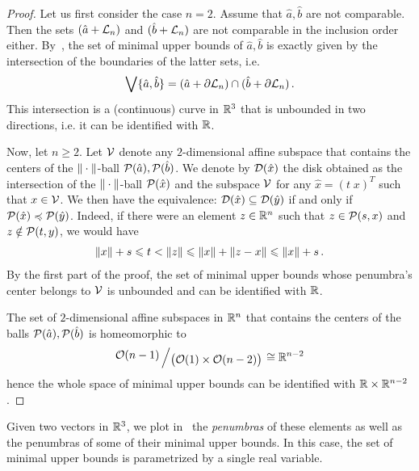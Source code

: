 \documentclass[main]{subfiles}
\begin{document}
\begin{proof}
Let us first consider the case $n = 2$. 
Assume that $\hat a, \hat b$ are not comparable. Then the sets $(\hat a + \mathcal{L}_n)$ and $(\hat b + \mathcal{L}_n)$ are not comparable in the inclusion order either.
By~, the set of minimal upper bounds of $\hat a, \hat b$ is exactly given by the intersection of the boundaries of the latter sets, i.e.
\begin{align*}
\bigvee \{ \hat a,\hat b\} = ( \hat a + \partial \mathcal{L}_n) \cap ( \hat b + \partial \mathcal{L}_n) \,.
\end{align*}
This intersection is a (continuous) curve in $\mathbb{R}^3$ that is unbounded in two directions, i.e. it can be identified with $\mathbb{R}$.

Now, let $n \geq 2$. Let $\mathcal{V}$ denote any $2$-dimensional affine subspace that contains the centers of the $\| \cdot \|$-ball $\mathcal{P}(\hat a), \mathcal{P}(\hat b)$. We denote by $\mathcal{D}(\hat x)$ the disk obtained as the intersection of the $\| \cdot \|$-ball $\mathcal{P}(\hat x)$ and the subspace $\mathcal{V}$ for any $\hat x = (t\;x)^T$ such that $x \in \mathcal{V}$. We then have the equivalence: $\mathcal{D}(\hat x) \subseteq \mathcal{D}(\hat y)$ if and only if $\mathcal{P}(\hat x) \preccurlyeq \mathcal{P}(\hat y)$. Indeed, if there were an element $z \in \mathbb{R}^n$ such that $z \in \mathcal{P}(s, x)$ and $z \notin \mathcal{P}(t,y)$, we would have
\begin{align*}
\| x \| + s \leqslant t < \| z \| \leqslant  \| x \| + \| z - x \| \leqslant \| x \| + s \,.
\end{align*}
By the first part of the proof, the set of minimal upper bounds whose penumbra's center belongs to $\mathcal{V}$ is unbounded and can be identified with $\mathbb{R}$. 

The set of $2$-dimensional affine subspaces in $\mathbb{R}^n$ that contains the centers of the balls $\mathcal{P}(\hat a), \mathcal{P}(\hat b)$ is homeomorphic to
\begin{align*}
\bigslant{\O(n-1)}{\big(\O(1) \times \O(n-2)\big)} \cong \R^{n-2}
\end{align*}
hence the whole space of minimal upper bounds can be identified with $\mathbb{R} \times \mathbb{R}^{n-2}$.
\end{proof}


 Given two vectors in $\mathbb{R}^{3}$, we plot in~
the \emph{penumbras} of these elements as well as the penumbras of some of  their minimal upper bounds. In this case, the set of minimal upper bounds is parametrized by a single real variable. 
\end{document}
